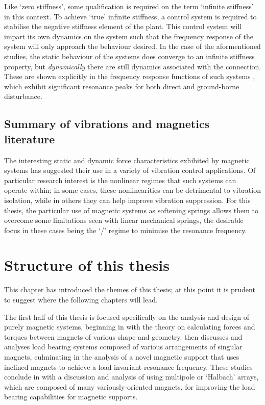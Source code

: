 \documentclass[11pt,a4paper]{memoir}
\begin{document}
Like `zero stiffness', some qualification is required on the term `infinite stiffness' in this context.
To achieve `true' infinite stiffness, a control system is required to stabilise the negative stiffness element of the plant.
This control system will impart its own dynamics on the system such that the frequency response of the system will only approach the behaviour desired.
In the case of the aformentioned studies, the static behaviour of the systems does converge to an infinite stiffness property, but \emph{dynamically} there are still dynamics associated with the connection.
These are shown explicitly in the frequency response functions of such systems \parencite{mizuno2010-jvc}, which exhibit significant resonance peaks for both direct and ground-borne disturbance.

\subsection{Summary of vibrations and magnetics literature}

The interesting static and dynamic force characteristics exhibited by magnetic systems has suggested their use in a variety of vibration control applications.
Of particular research interest is the nonlinear regimes that such systems can operate within; in some cases, these nonlinearities can be detrimental to vibration isolation, while in others they can help improve vibration suppression.
For this thesis, the particular use of magnetic systems as softening springs allows them to overcome some limitations seen with linear mechanical springs, the desirable focus in these cases being the `\qzs/' regime to minimise the resonance frequency.

\section{Structure of this thesis}

This chapter has introduced the themes of this thesis; at this point it is prudent to suggest where the following chapters will lead.

The first half of this thesis is focused specifically on the analysis and design of purely magnetic systems, beginning in  with the theory on calculating forces and torques between magnets of various shape and geometry.
 then discusses and analyses load bearing systems composed of various arrangements of singular magnets, culminating in the analysis of a novel magnetic support that uses inclined magnets to achieve a load-invariant resonance frequency.
These studies conclude in  with a discussion and analysis of using multipole or `Halbach' arrays, which are composed of many variously-oriented magnets, for improving the load bearing capabilities for magnetic supports.
\end{document}
